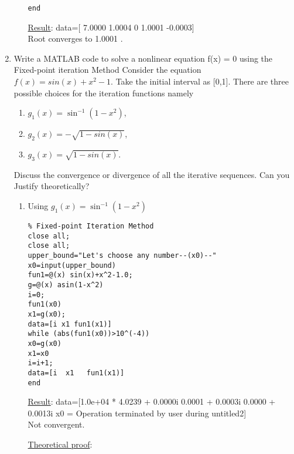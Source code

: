 \documentclass{article}
\begin{document}
\begin{enumerate}
\begin{enumerate}
\begin{lstlisting}
end

\end{lstlisting}
\underline{Result}: data=[ 7.0000    1.0004   0  1.0001  -0.0003]\\
Root converges to 1.0001 .
\end{enumerate}
\item Write a MATLAB code to solve a nonlinear equation f(x) = 0 using the Fixed-point iteration Method Consider the equation $f(x)=sin(x)+x^2-1$. Take the initial interval as [0,1]. There are three possible choices for the iteration functions namely\begin{enumerate} \item $g_1(x) =\sin^{-1}{(1-x^2)}$, \item $g_2(x) =-\sqrt{1-sin(x)}$, \item $g_3(x) =\sqrt{1-sin(x)}$.\end{enumerate}
Discuss the convergence or divergence of all the iterative sequences. Can you Justify theoretically?
\begin{enumerate}
    \item Using $g_1(x) =\sin^{-1}{(1-x^2)}$
    \begin{lstlisting}
% Fixed-point Iteration Method
close all;
close all;
upper_bound="Let's choose any number--(x0)--"
x0=input(upper_bound)
fun1=@(x) sin(x)+x^2-1.0;
g=@(x) asin(1-x^2)
i=0;
fun1(x0)
x1=g(x0);
data=[i x1 fun1(x1)]
while (abs(fun1(x0))>10^(-4))
x0=g(x0)
x1=x0
i=i+1;
data=[i  x1   fun1(x1)]
end  
    \end{lstlisting}
    \underline{Result}: data=[1.0e+04 *
4.0239 + 0.0000i   0.0001 + 0.0003i   0.0000 + 0.0013i
x0 =
Operation terminated by user during untitled2]\\
 Not convergent.


\underline{Theoretical proof}:


\end{enumerate}
\end{enumerate}
\end{document}
